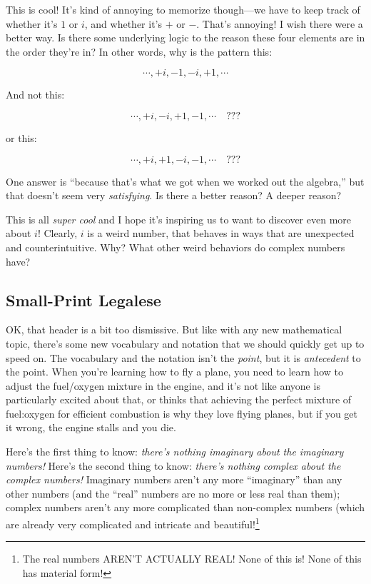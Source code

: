 \documentclass[
]{article}
\begin{document}
This is cool! It's kind of annoying to memorize though---we have to keep
track of whether it's \(1\) or \(i\), and whether it's \(+\) or \(-\).
That's annoying! I wish there were a better way. Is there some
underlying logic to the reason these four elements are in the order
they're in? In other words, why is the pattern this:

\[ \cdots, +i, -1, -i, +1, \cdots\]

And not this:

\[ \cdots, +i,-i,+1,-1, \cdots\quad???\]

or this:

\[ \cdots, +i,+1,-i,-1, \cdots\quad???\]

One answer is ``because that's what we got when we worked out the
algebra,'' but that doesn't seem very \emph{satisfying}. Is there a
better reason? A deeper reason?

This is all \emph{super cool} and I hope it's inspiring us to want to
discover even more about \(i\)! Clearly, \(i\) is a weird number, that
behaves in ways that are unexpected and counterintuitive. Why? What
other weird behaviors do complex numbers have?

\hypertarget{small-print-legalese}{%
\subsection{Small-Print Legalese}\label{small-print-legalese}}

OK, that header is a bit too dismissive. But like with any new
mathematical topic, there's some new vocabulary and notation that we
should quickly get up to speed on. The vocabulary and the notation isn't
the \emph{point}, but it is \emph{antecedent} to the point. When you're
learning how to fly a plane, you need to learn how to adjust the
fuel/oxygen mixture in the engine, and it's not like anyone is
particularly excited about that, or thinks that achieving the perfect
mixture of fuel:oxygen for efficient combustion is why they love flying
planes, but if you get it wrong, the engine stalls and you die.

Here's the first thing to know: \emph{there's nothing imaginary about
the imaginary numbers!} Here's the second thing to know: \emph{there's
nothing complex about the complex numbers!} Imaginary numbers aren't any
more ``imaginary'' than any other numbers (and the ``real'' numbers are
no more or less real than them); complex numbers aren't any more
complicated than non-complex numbers (which are already very complicated
and intricate and beautiful!\footnote{The real numbers AREN'T ACTUALLY
  REAL! None of this is! None of this has material form!}
\end{document}
